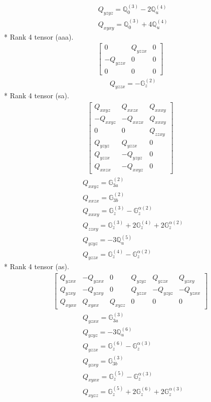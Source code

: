 \documentclass[fleqn,8pt,landscape]{jsarticle}
\begin{document}
\begin{align*}
& Q_{yzyz} = \mathbb{Q}_{0}^{(3)} - 2 \mathbb{Q}_{u}^{(4)} \\
& Q_{xyxy} = \mathbb{Q}_{0}^{(3)} + 4 \mathbb{Q}_{u}^{(4)}
\end{align*}
* Rank 4 tensor (aaa).
\begin{align*}
\begin{bmatrix} 0 & Q_{yzzx} & 0 \\ - Q_{yzzx} & 0 & 0 \\ 0 & 0 & 0 \end{bmatrix}
\end{align*}
\begin{align*}
& Q_{yzzx} = - \mathbb{G}_{z}^{(2)}
\end{align*}
* Rank 4 tensor (sa).
\begin{align*}
\begin{bmatrix} Q_{xxyz} & Q_{xxzx} & Q_{xxxy} \\ - Q_{xxyz} & - Q_{xxzx} & Q_{xxxy} \\ 0 & 0 & Q_{zzxy} \\ Q_{yzyz} & Q_{yzzx} & 0 \\ Q_{yzzx} & - Q_{yzyz} & 0 \\ Q_{xxzx} & - Q_{xxyz} & 0 \end{bmatrix}
\end{align*}
\begin{align*}
& Q_{xxyz} = \mathbb{G}_{3a}^{(2)} \\
& Q_{xxzx} = \mathbb{G}_{3b}^{(2)} \\
& Q_{xxxy} = \mathbb{G}_{z}^{(3)} - \mathbb{G}_{z}^{\alpha(2)} \\
& Q_{zzxy} = \mathbb{G}_{z}^{(3)} + 2 \mathbb{G}_{z}^{(4)} + 2 \mathbb{G}_{z}^{\alpha(2)} \\
& Q_{yzyz} = - 3 \mathbb{Q}_{u}^{(5)} \\
& Q_{yzzx} = \mathbb{G}_{z}^{(4)} - \mathbb{G}_{z}^{\alpha(2)}
\end{align*}
* Rank 4 tensor (as).
\begin{align*}
\begin{bmatrix} Q_{yzxx} & - Q_{yzxx} & 0 & Q_{yzyz} & Q_{yzzx} & Q_{yzxy} \\ Q_{yzxy} & - Q_{yzxy} & 0 & Q_{yzzx} & - Q_{yzyz} & - Q_{yzxx} \\ Q_{xyxx} & Q_{xyxx} & Q_{xyzz} & 0 & 0 & 0 \end{bmatrix}
\end{align*}
\begin{align*}
& Q_{yzxx} = \mathbb{G}_{3a}^{(3)} \\
& Q_{yzyz} = - 3 \mathbb{Q}_{u}^{(6)} \\
& Q_{yzzx} = \mathbb{G}_{z}^{(6)} - \mathbb{G}_{z}^{\alpha(3)} \\
& Q_{yzxy} = \mathbb{G}_{3b}^{(3)} \\
& Q_{xyxx} = \mathbb{G}_{z}^{(5)} - \mathbb{G}_{z}^{\alpha(3)} \\
& Q_{xyzz} = \mathbb{G}_{z}^{(5)} + 2 \mathbb{G}_{z}^{(6)} + 2 \mathbb{G}_{z}^{\alpha(3)}
\end{align*}
\end{document}
